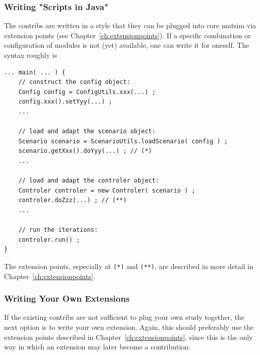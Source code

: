 \subsubsection{Writing "Scripts in Java"}
\label{sec:writing-scripts-java}
The contribs are written in a style that they can be plugged into core \gls{matsim} via extension points (see Chapter~\ref{ch:extensionpoints}). If a specific combination or configuration of modules is not (yet) available, one can write it for oneself. The syntax roughly is
\begin{lstlisting}
... main( ... ) {
    // construct the config object:
    Config config = ConfigUtils.xxx(...) ;
    config.xxx().setYyy(...) ;
    ...

    // load and adapt the scenario object:
    Scenario scenario = ScenarioUtils.loadScenario( config ) ;
    scenario.getXxx().doYyy(...) ; // (*)
    ...

    // load and adapt the controler object:
    Controler controler = new Controler( scenario ) ;
    controler.doZzz(...) ; // (**)
    ...

    // run the iterations:
    controler.run() ;
}
\end{lstlisting}
The extension points, especially at \lstinline{(*)} and \lstinline{(**)}, are described in more detail in Chapter~\ref{ch:extensionpoints}.

\subsubsection{Writing Your Own Extensions}
\label{sec:writing-your-own-extensions}
If the existing \glspl{contrib} are not sufficient to plug your own study together, the next option is to write your own \gls{extension}.  Again, this should preferably use the extension points described in Chapter~\ref{ch:extensionpoints}, since this is the only way in which an \gls{extension} may later become a \gls{contribution}.  



